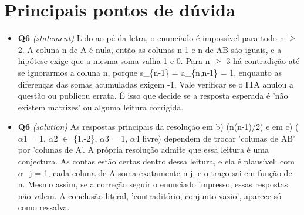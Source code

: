 \documentclass{article}%
\begin{document}
%
\section*{Principais pontos de dúvida}%
\begin{itemize}%
\item%
\textbf{Q6} \textit{(statement)} Lido ao pé da letra, o enunciado é impossível para todo n $\geq$ 2. A coluna n de A é nula, então as colunas n-1 e n de AB são iguais, e a hipótese exige que a mesma soma valha 1 e 0. Para n $\geq$ 3 há contradição até se ignorarmos a coluna n, porque s\_\{n-1\} = a\_\{n,n-1\} = 1, enquanto as diferenças das somas acumuladas exigem -1. Vale verificar se o ITA anulou a questão ou publicou errata. É isso que decide se a resposta esperada é 'não existem matrizes' ou alguma leitura corrigida.%
\item%
\textbf{Q6} \textit{(solution)} As respostas principais da resolução em b) (n(n-1)/2) e em c) ($\alpha$1 = 1, $\alpha$2 $\in$ \{1,-2\}, $\alpha$3 = 1, $\alpha$4 livre) dependem de trocar 'colunas de AB' por 'colunas de A'. A própria resolução admite que essa leitura é uma conjectura. As contas estão certas dentro dessa leitura, e ela é plausível: com $\alpha$\_j = 1, cada coluna de A soma exatamente n-j, e o traço sai em função de n. Mesmo assim, se a correção seguir o enunciado impresso, essas respostas não valem. A conclusão literal, 'contraditório, conjunto vazio', aparece só como ressalva.%
\end{itemize}%
\end{document}
